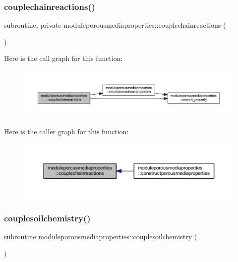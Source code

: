 \subsubsection{\texorpdfstring{couplechainreactions()}{couplechainreactions()}}
{\footnotesize\ttfamily subroutine, private moduleporousmediaproperties\+::couplechainreactions (\begin{DoxyParamCaption}{ }\end{DoxyParamCaption})\hspace{0.3cm}{\ttfamily [private]}}

Here is the call graph for this function\+:\nopagebreak
\begin{figure}[H]
\begin{center}
\leavevmode
\includegraphics[width=350pt]{namespacemoduleporousmediaproperties_a2d7950fe81dbe3ec4b45b30ce9e19e5c_cgraph}
\end{center}
\end{figure}
Here is the caller graph for this function\+:\nopagebreak
\begin{figure}[H]
\begin{center}
\leavevmode
\includegraphics[width=350pt]{namespacemoduleporousmediaproperties_a2d7950fe81dbe3ec4b45b30ce9e19e5c_icgraph}
\end{center}
\end{figure}
\mbox{\label{namespacemoduleporousmediaproperties_aee3bf1633a5fbeea01e36455f4b4559c}} 
\subsubsection{\texorpdfstring{couplesoilchemistry()}{couplesoilchemistry()}}
{\footnotesize\ttfamily subroutine moduleporousmediaproperties\+::couplesoilchemistry (\begin{DoxyParamCaption}{ }\end{DoxyParamCaption})\hspace{0.3cm}{\ttfamily [private]}}

